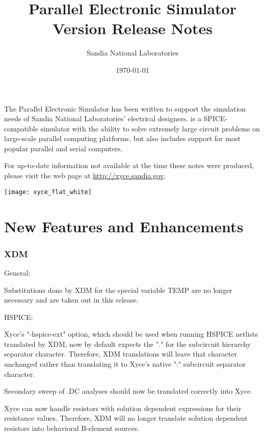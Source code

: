 \documentclass[letterpaper]{scrartcl}
\title{\XyceTitle{} Parallel Electronic Simulator\\
Version \XyceVersionVar{} Release Notes}
\author{ Sandia National Laboratories}
\date{\today}
\begin{document}
\maketitle

The \XyceTM{} Parallel Electronic Simulator has been written to support the
simulation needs of Sandia National Laboratories' electrical designers.
\XyceTM{} is a SPICE-compatible simulator with the ability to solve extremely
large circuit problems on large-scale parallel computing platforms, but also
includes support for most popular parallel and serial computers.

For up-to-date information not available at the time these notes were produced,
please visit the \XyceTM{} web page at
{\color{XyceDeepRed}\url{http://xyce.sandia.gov}}.

\tableofcontents
\vspace*{\fill}
\parbox{\textwidth}
{
  \hfill
  \texttt{[image: xyce\_flat\_white]}
}


\newpage
\section{New Features and Enhancements}

\subsubsection*{XDM}
\begin{XyceItemize}
\item General:
  \begin{XyceItemize}
  \item Substitutions done by XDM for the special variable
    TEMP are no longer necessary and are taken out in this release.
  \end{XyceItemize}
\item HSPICE:
  \begin{XyceItemize}
  \item  Xyce's "-hspice-ext" option, which should be used
    when running HSPICE netlists translated by XDM, now by default
    expects the "." for the subcircuit hierarchy separator
    character. Therefore, XDM translations will leave that character
    unchanged rather than translating it to Xyce's native ":"
    subcircuit separator character.
  \item  Secondary sweep of .DC analyses should now be
    translated correctly into Xyce.
  \item  Xyce can now handle resistors with solution dependent
    expressions for their resistance values. Therefore, XDM will no
    longer translate solution dependent resistors into behavioral
    B-element sources.
  \end{XyceItemize}
\end{XyceItemize}
\end{document}

